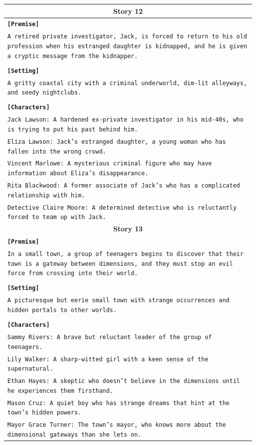 \documentclass[letterpaper]{article} %
\begin{document}
\begin{small}
\begin{longtable}{p{\textwidth}}
    \multicolumn{1}{c}{\textbf{Story 12}} \\
    \midrule
    \texttt{\textbf{[Premise]}} \\
    \texttt{A retired private investigator, Jack, is forced to return to his old profession when his estranged daughter is kidnapped, and he is given a cryptic message from the kidnapper.} \\\\
    \texttt{\textbf{[Setting]}} \\
    \texttt{A gritty coastal city with a criminal underworld, dim-lit alleyways, and seedy nightclubs.} \\\\
    \texttt{\textbf{[Characters]}} \\
    \texttt{Jack Lawson: A hardened ex-private investigator in his mid-40s, who is trying to put his past behind him.} \\
    \texttt{Eliza Lawson: Jack's estranged daughter, a young woman who has fallen into the wrong crowd.} \\
    \texttt{Vincent Marlowe: A mysterious criminal figure who may have information about Eliza's disappearance.} \\
    \texttt{Rita Blackwood: A former associate of Jack's who has a complicated relationship with him.} \\
    \texttt{Detective Claire Moore: A determined detective who is reluctantly forced to team up with Jack.} \\
    \midrule
  
    \multicolumn{1}{c}{\textbf{Story 13}} \\
    \midrule
    \texttt{\textbf{[Premise]}} \\
    \texttt{In a small town, a group of teenagers begins to discover that their town is a gateway between dimensions, and they must stop an evil force from crossing into their world.} \\\\
    \texttt{\textbf{[Setting]}} \\
    \texttt{A picturesque but eerie small town with strange occurrences and hidden portals to other worlds.} \\\\
    \texttt{\textbf{[Characters]}} \\
    \texttt{Sammy Rivers: A brave but reluctant leader of the group of teenagers.} \\
    \texttt{Lily Walker: A sharp-witted girl with a keen sense of the supernatural.} \\
    \texttt{Ethan Hayes: A skeptic who doesn't believe in the dimensions until he experiences them firsthand.} \\
    \texttt{Mason Cruz: A quiet boy who has strange dreams that hint at the town's hidden powers.} \\
    \texttt{Mayor Grace Turner: The town's mayor, who knows more about the dimensional gateways than she lets on.} \\
    \midrule
  

\end{longtable}
\end{small}
\end{document}
